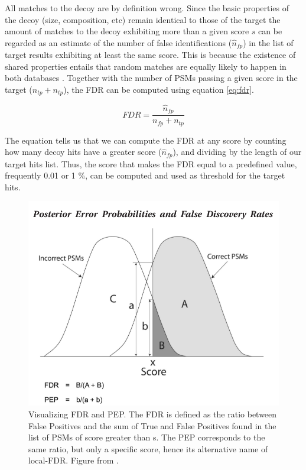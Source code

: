 \documentclass[11pt, a4paper]{report}
\begin{document}
All matches to the decoy are by definition wrong. Since the basic properties of the decoy (size, composition, etc) remain identical to those of the target the amount of matches to the decoy exhibiting more than a given score $s$ can be regarded as an estimate of the number of false identifications ($\hat{n}_{fp}$) in the list of target results exhibiting at least the same score. This is because the existence of shared properties entails that random matches are equally likely to happen in both databases \cite{Elias2010}. Together with the number of PSMs passing a given score in the target ($n_{tp} + n_{tp}$), the FDR can be computed using equation \ref{eq:fdr}.

\begin{equation}\label{eq:fdr}
FDR = \frac{\hat{n}_{fp}}{n_{fp} + n_{tp}}
\end{equation}

The equation tells us that we can compute the FDR at any score by counting how many decoy hits have a greater score ($\hat{n}_{fp}$), and dividing by the length of our target hits list. Thus, the score that makes the FDR equal to a predefined value, frequently 0.01 or 1 \%, can be computed and used as threshold for the target hits.

\begin{figure}[!h]
\centering
\includegraphics[width=0.9\linewidth]{pep}
\caption{Visualizing FDR and PEP. The FDR is defined as the ratio between False Positives and the sum of True and False Positives found in the list of PSMs of score greater than s. The PEP corresponds to the same ratio, but only a specific score, hence its alternative name of local-FDR. Figure from \cite{Kall2008}.}
\label{fig:pep}
\end{figure}
\end{document}
